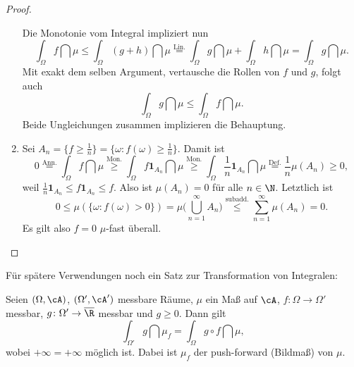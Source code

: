 \begin{proof}
\begin{enumerate}[label=(\roman*)]
		Die Monotonie vom Integral impliziert nun
		\[ \int_{\Omega} f \dint \mu \leq \int_{\Omega} (g+h) \dint \mu \overset{\text{Lin.}}{=} \int_{\Omega} g \dint \mu + \int_{\Omega} h \dint \mu = \int_{\Omega} g \dint \mu. \]
		Mit exakt dem selben Argument, vertausche die Rollen von $f$ und $g$, folgt auch \[\int_{\Omega} g \dint \mu \leq \int_{\Omega} f \dint \mu. \] Beide Ungleichungen zusammen implizieren die Behauptung.
		\item Sei $A_n = \{ f \geq \frac{1}{n} \} = \{ \omega \colon f(\omega) \geq \frac{1}{n} \}$. Damit ist 
		\[ 0 \overset{\text{Ann.}}{=} \int_{\Omega} f \dint \mu \overset{\text{Mon.}}{\geq} \int_{\Omega} f \mathbf{1}_{A_n} \dint \mu \overset{\text{Mon.}}{\geq} \int_{\Omega} \frac{1}{n} \mathbf{1}_{A_n} \dint \mu\overset{\text{Def.}}{=} \frac 1 n \mu(A_n)\geq 0, \]
		weil $\frac{1}{n} \mathbf{1}_{A_n} \leq f \mathbf{1}_{A_n}\leq f$. Also ist $\mu(A_n) = 0$ f\"ur alle $n\in\N$. Letztlich ist 
		\[  0\leq \mu( \{ \omega\colon f(\omega) > 0 \}) = \mu\Big( \bigcup\limits_{n=1}^{\infty} A_n \Big) \overset{\text{subadd.}}{\leq} \sum\limits_{n=1}^{\infty} \mu(A_n) = 0. \]
		Es gilt also $f=0$ $\mu$-fast überall.
	\end{enumerate}
\end{proof}
F\"ur sp\"atere Verwendungen noch ein Satz zur Transformation von Integralen:
\begin{satz}\label{trafo}
	Seien $(\Omega, \cA)$, $(\Omega', \cA')$ messbare Räume, $\mu$ ein Maß auf $\cA$, $f \colon \Omega \rightarrow \Omega'$ messbar, $g \colon \Omega' \rightarrow \overline{\R}$ messbar und $g \geq 0$. Dann gilt 
	\[ \int_{\Omega'} g \dint \mu_f = \int_{\Omega} g \circ f \dint \mu, \] wobei $+\infty=+\infty$ m\"oglich ist. Dabei ist $\mu_f$ der push-forward (Bildma\ss ) von $\mu$.
\begin{center}	
\end{center}
\end{satz}

